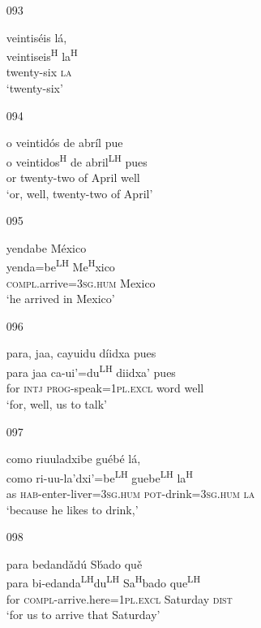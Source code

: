 \begin{itemize}
\item[093]
 
\glll   veintis\'{e}is l\'{a}, \\
 veintiseis\textsuperscript{H} la\textsuperscript{H}\\
 twenty-six \textsc{la}\\
\glt `twenty-six'
 


\item[094]
 
\glll   o veintid\'{o}s de abr\'{i}l pue\\
o veintidos\textsuperscript{H} de abril\textsuperscript{LH} pues\\
 or twenty-two of April well\\
\glt `or, well, twenty-two of April'
 


\item[095]
 
\glll   yendabe M\'{e}xico \\
yenda=be\textsuperscript{LH} Me\textsuperscript{H}xico\\
\textsc{compl}.arrive=\textsc{3sg.hum} Mexico\\
\glt `he arrived in Mexico'
 

\item[096]
 
\glll   para, jaa, cayuidu d\'{i}idxa pues \\
para jaa ca-ui'=du\textsuperscript{LH} diidxa' pues \\
for \textsc{intj} \textsc{prog}-speak=\textsc{1pl.excl} word well\\
\glt `for, well, us to talk'
 

\item[097]
 
\glll   como riuuladxibe gu\'{e}b\'{e} l\'{a},\\
como ri-uu-la'dxi'=be\textsuperscript{LH} guebe\textsuperscript{LH} la\textsuperscript{H}\\
as \textsc{hab}-enter-liver=\textsc{3sg.hum} \textsc{pot}-drink=\textsc{3sg.hum} \textsc{la}\\
\glt `because he likes to drink,'
 

\item[098]
 
\glll   para bedand\v{a}d\'{u} S\'{b}ado qu\v{e} \\
para bi-edanda\textsuperscript{LH}du\textsuperscript{LH} Sa\textsuperscript{H}bado que\textsuperscript{LH} \\
for \textsc{compl}-arrive.here=\textsc{1pl.excl} Saturday \textsc{dist}\\
\glt `for us to arrive that Saturday'
 



\end{itemize}
